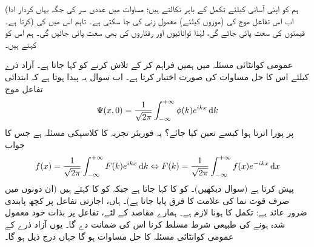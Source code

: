 (ہم  کو اپنی آسانی کیلئے تکمل کے باہر نکالتے ہیں؛ مساوات 
  میں عددی سر  کی جگہ یہاں  کردار ادا کرتا ہے۔) اب اس تفاعل موج کی (موزوں  کیلئے) معمول زنی کی جا سکتی ہے۔ تاہم اس میں  کی قیمتوں کی سعت پائی جائے گی، لہٰذا توانائیوں اور رفتاروں کی بھی سعت پائی جائیں گی۔ ہم اس کو  کہتے ہیں۔

عمومی کوانٹائی مسئلہ میں ہمیں  فراہم کر کے  تلاش کرنے کو کہا جاتا ہے۔ آزاد ذرے کیلئے اس کا حل مساوات  کی صورت اختیار کرتا ہے۔ اب سوال یہ پیدا ہوتا ہے کہ ابتدائی تفاعل موج 
\begin{align}
\Psi (x,0) = \frac{1}{\sqrt{2\pi}} \int_{- \infty}^{+ \infty} \phi (k) e^{ikx} \dif k
\end{align}
پر پورا اترتا ہوا  کیسے تعین کیا جائے؟ یہ فوریئر تجزیہ کا کلاسیکی مسئلہ ہے جس کا جواب 
\begin{align}\label{مساوات_شروڈنگر_مسئلہ_پلانشرل}
f(x) = \frac{1}{\sqrt{2\pi}} \int_{- \infty}^{+ \infty} F(k) e^{ikx} \dif k \Leftrightarrow F(k) = \frac{1}{\sqrt{2\pi}} \int_{- \infty}^{+ \infty} f(x) e^{-ikx} \dif x
\end{align}
 پیش کرتا ہے (سوال  دیکھیں)۔  کو  کا  کہا جاتا ہے جبکہ  کو  کا  کہتے ہیں (ان دونوں میں صرف قوت نما کی علامت کا فرق پایا جاتا ہے)۔ ہاں، اجازتی تفاعل پر کچھ پابندی ضرور عائد ہے: تکمل کا  ہونا لازم ہے۔ ہمارے مقاصد کے لئے، تفاعل  پر بذات خود معمول شدہ ہونے کی طبیعی شرط مسلط کرنا اس کی ضمانت دے گا۔ یوں آزاد ذرے کے عمومی کوانٹائی مسئلہ کا حل مساوات  ہو گا جہاں  درج ذیل ہو گا۔ 
